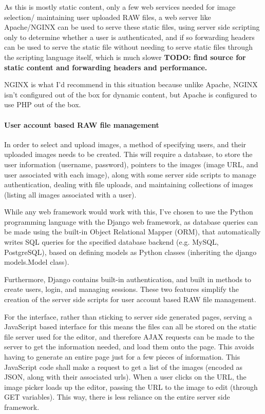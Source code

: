 \documentclass[12pt,a4paper]{article}
\begin{document}
As this is mostly static content, only a few web services needed for image selection/
maintaining user uploaded RAW files, a web server like Apache/NGINX can be used to serve
these static files, using server side scripting only to determine whether a user is authenticated,
and if so forwarding headers can be used to serve the static file without needing to serve static files
through the scripting language itself, which is much slower
\textbf{TODO: find source for static content and forwarding headers and performance.}

NGINX is what I'd recommend in this situation because unlike Apache, NGINX isn't
configured out of the box for dynamic content, but Apache is configured to use PHP
out of the box.

\paragraph{User account based RAW file management}
In order to select and upload images, a method of specifying users, and their uploaded
images needs to be created. This will require a database, to store the user information (username,
password), pointers to the images (image URL, and user associated with each image), along with some
server side scripts to manage authentication, dealing with file uploads, and maintaining collections
of images (listing all images associated with a user).

While any web framework would work with this, I've chosen to use the Python programming
language with the Django web framework, as database queries can be made using the built-in
Object Relational Mapper (ORM), that automatically writes SQL queries for the specified
database backend (e.g. MySQL, PostgreSQL), based on defining models as Python classes (inheriting
the django models.Model class).

Furthermore, Django contains built-in authentication, and built in methods to create users,
login, and managing sessions. These two features simplify the creation of the server side scripts
for user account based RAW file management.

For the interface, rather than sticking to server side generated pages, serving a JavaScript based
interface for this means the files can all be stored on the static file server used for the editor,
and therefore AJAX requests can be made to the server to get the information needed, and load them
onto the page. This avoids having to generate an entire page just for a few pieces of information. This
JavaScript code shall make a request to get a list of the images (encoded as JSON, along with their associated
urls). When a user clicks on the URL, the image picker loads up the editor, passing the URL to the image to edit (through
GET variables). This way, there is less reliance on the entire server side framework.
\end{document}

